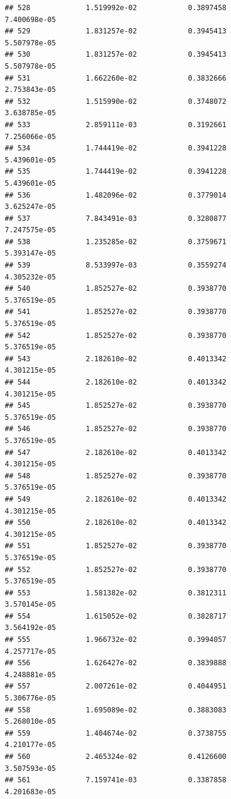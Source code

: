 \documentclass[
]{article}
\begin{document}
\begin{verbatim}
## 528             1.519992e-02            0.3897458            7.400698e-05
## 529             1.831257e-02            0.3945413            5.507978e-05
## 530             1.831257e-02            0.3945413            5.507978e-05
## 531             1.662260e-02            0.3832666            2.753843e-05
## 532             1.515990e-02            0.3748072            3.638785e-05
## 533             2.859111e-03            0.3192661            7.256066e-05
## 534             1.744419e-02            0.3941228            5.439601e-05
## 535             1.744419e-02            0.3941228            5.439601e-05
## 536             1.482096e-02            0.3779014            3.625247e-05
## 537             7.843491e-03            0.3280877            7.247575e-05
## 538             1.235285e-02            0.3759671            5.393147e-05
## 539             8.533997e-03            0.3559274            4.305232e-05
## 540             1.852527e-02            0.3938770            5.376519e-05
## 541             1.852527e-02            0.3938770            5.376519e-05
## 542             1.852527e-02            0.3938770            5.376519e-05
## 543             2.182610e-02            0.4013342            4.301215e-05
## 544             2.182610e-02            0.4013342            4.301215e-05
## 545             1.852527e-02            0.3938770            5.376519e-05
## 546             1.852527e-02            0.3938770            5.376519e-05
## 547             2.182610e-02            0.4013342            4.301215e-05
## 548             1.852527e-02            0.3938770            5.376519e-05
## 549             2.182610e-02            0.4013342            4.301215e-05
## 550             2.182610e-02            0.4013342            4.301215e-05
## 551             1.852527e-02            0.3938770            5.376519e-05
## 552             1.852527e-02            0.3938770            5.376519e-05
## 553             1.581382e-02            0.3812311            3.570145e-05
## 554             1.615052e-02            0.3828717            3.564192e-05
## 555             1.966732e-02            0.3994057            4.257717e-05
## 556             1.626427e-02            0.3839888            4.248881e-05
## 557             2.007261e-02            0.4044951            5.306776e-05
## 558             1.695089e-02            0.3883083            5.268010e-05
## 559             1.404674e-02            0.3738755            4.210177e-05
## 560             2.465324e-02            0.4126600            3.507593e-05
## 561             7.159741e-03            0.3387858            4.201683e-05

\end{verbatim}
\end{document}
